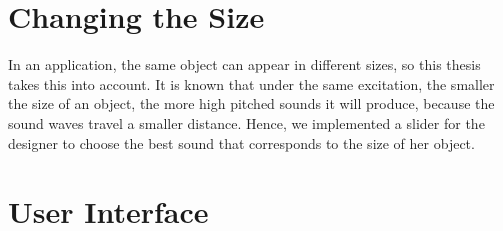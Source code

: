 \section{Changing the Size}
In an application, the same object can appear in different sizes, so this thesis takes this into account. It is known that under the same excitation, the smaller the size of an object, the more high pitched sounds it will produce, because the sound waves travel a smaller distance. Hence, we implemented a slider for the designer to choose the best sound that corresponds to the size of her object. 

\section{User Interface}
